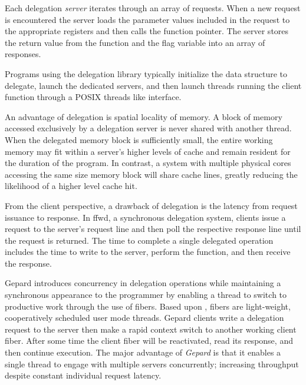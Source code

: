 \documentclass{uicthesi}
\begin{document}
Each delegation \textit{server} iterates through an array of requests. When a new request is encountered the server loads the parameter values included in the request to the appropriate registers and then calls the function pointer. The server stores the return value from the function and the flag variable into an array of responses. 

Programs using the delegation library typically initialize the data structure to delegate, launch the dedicated servers, and then launch threads running the client function through a POSIX threads like interface. 


An advantage of delegation is spatial locality of memory. A block of memory accessed exclusively by a delegation server is never shared with another thread. When the delegated memory block is sufficiently small, the entire working memory may fit within a server's higher levels of cache and remain resident for the duration of the program. In contrast, a system with multiple physical cores accessing the same size memory block will share cache lines, greatly reducing the likelihood of a higher level cache hit. 

From the client perspective, a drawback of delegation is the latency from request issuance to response. In ffwd, a synchronous delegation system, clients issue a request to the server's request line and then poll the respective response line until the request is returned. The time to complete a single delegated operation includes the time to write to the server, perform the function, and then receive the response. 

Gepard introduces concurrency in delegation operations while maintaining a synchronous appearance to the programmer by enabling a thread to switch to productive work through the use of fibers. Based upon \cite{libfiber}, fibers are light-weight, cooperatively scheduled user mode threads. Gepard clients write a delegation request to the server then make a rapid context switch to another working client fiber. After some time the client fiber will be reactivated, read its response, and then continue execution. The major advantage of \textit{Gepard} is that it enables a single thread to engage with multiple servers concurrently; increasing throughput despite constant individual request latency. 
\end{document}
